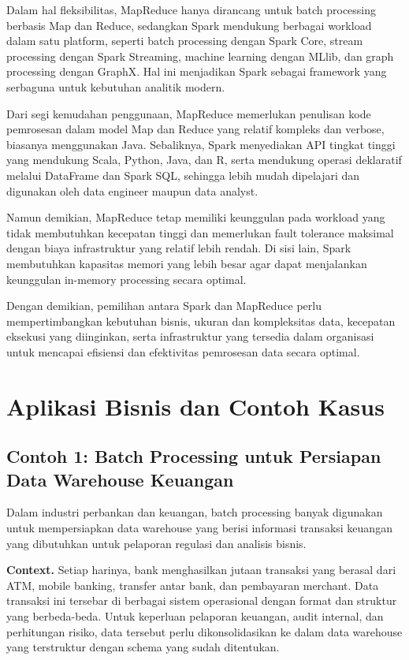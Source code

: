 Dalam hal fleksibilitas, MapReduce hanya dirancang untuk batch processing berbasis Map dan Reduce, sedangkan Spark mendukung berbagai workload dalam satu platform, seperti batch processing dengan Spark Core, stream processing dengan Spark Streaming, machine learning dengan MLlib, dan graph processing dengan GraphX. Hal ini menjadikan Spark sebagai framework yang serbaguna untuk kebutuhan analitik modern.

Dari segi kemudahan penggunaan, MapReduce memerlukan penulisan kode pemrosesan dalam model Map dan Reduce yang relatif kompleks dan verbose, biasanya menggunakan Java. Sebaliknya, Spark menyediakan API tingkat tinggi yang mendukung Scala, Python, Java, dan R, serta mendukung operasi deklaratif melalui DataFrame dan Spark SQL, sehingga lebih mudah dipelajari dan digunakan oleh data engineer maupun data analyst.

Namun demikian, MapReduce tetap memiliki keunggulan pada workload yang tidak membutuhkan kecepatan tinggi dan memerlukan fault tolerance maksimal dengan biaya infrastruktur yang relatif lebih rendah. Di sisi lain, Spark membutuhkan kapasitas memori yang lebih besar agar dapat menjalankan keunggulan in-memory processing secara optimal.

Dengan demikian, pemilihan antara Spark dan MapReduce perlu mempertimbangkan kebutuhan bisnis, ukuran dan kompleksitas data, kecepatan eksekusi yang diinginkan, serta infrastruktur yang tersedia dalam organisasi untuk mencapai efisiensi dan efektivitas pemrosesan data secara optimal.



\section{Aplikasi Bisnis dan Contoh Kasus}

\subsection{Contoh 1: Batch Processing untuk Persiapan Data Warehouse Keuangan}


Dalam industri perbankan dan keuangan, batch processing banyak digunakan untuk mempersiapkan data warehouse yang berisi informasi transaksi keuangan yang dibutuhkan untuk pelaporan regulasi dan analisis bisnis. 

\textbf{Context.} Setiap harinya, bank menghasilkan jutaan transaksi yang berasal dari ATM, mobile banking, transfer antar bank, dan pembayaran merchant. Data transaksi ini tersebar di berbagai sistem operasional dengan format dan struktur yang berbeda-beda. Untuk keperluan pelaporan keuangan, audit internal, dan perhitungan risiko, data tersebut perlu dikonsolidasikan ke dalam data warehouse yang terstruktur dengan schema yang sudah ditentukan.

